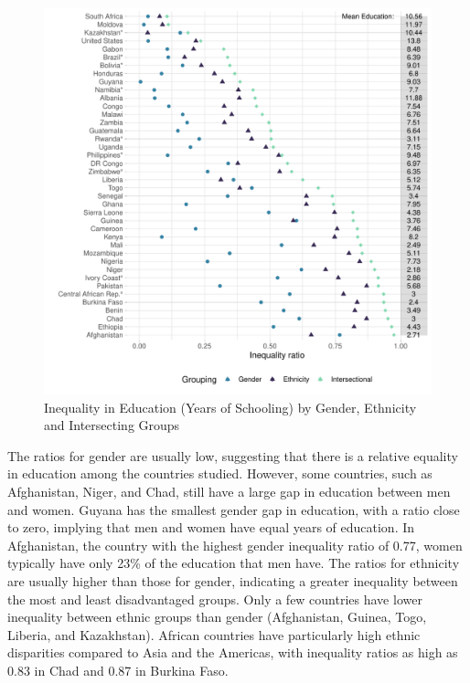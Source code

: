 \begin{figure}[htb]
\includegraphics{figures/world} 
\caption[Inequality in Education]{Inequality in Education (Years of Schooling) by Gender, Ethnicity and Intersecting Groups}
\label{fig:world}
\end{figure}

The ratios for gender are usually low, suggesting that there is a relative equality in education among the countries studied. However, some countries, such as Afghanistan, Niger, and Chad, still have a large gap in education between men and women. Guyana has the smallest gender gap in education, with a ratio close to zero, implying that men and women have equal years of education. In Afghanistan, the country with the highest gender inequality ratio of 0.77, women typically have only 23\% of the education that men have. The ratios for ethnicity are usually higher than those for gender, indicating a greater inequality between the most and least disadvantaged groups. Only a few countries have lower inequality between ethnic groups than gender (Afghanistan, Guinea, Togo, Liberia, and Kazakhstan). African countries have particularly high ethnic disparities compared to Asia and the Americas, with inequality ratios as high as 0.83 in Chad and 0.87 in Burkina Faso. 

